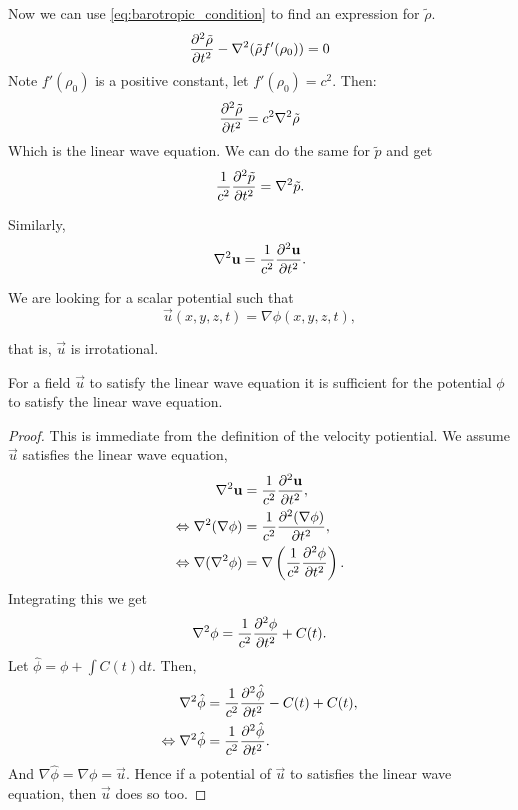 Now we can use \ref{eq:barotropic_condition} to find an expression for $\tilde{\rho}$.
\begin{equation*}
    \frac{\partial ^2 \tilde{\rho}}{\partial t^2} - \nabla^2 (\tilde{\rho} f'(\rho_0)) = 0
\end{equation*}
Note $f'(\rho_0)$ is a positive constant, let $f'(\rho_0) = c^2$. Then:
\begin{equation}
    \frac{\partial ^2 \tilde{\rho}}{\partial t^2} = c^2 \nabla^2 \tilde{\rho}
\end{equation}
Which is the linear wave equation. We can do the same for $\tilde{p}$ and get
    \begin{equation}
        \frac{1}{c^2}\frac{\partial ^2 \tilde{p}}{\partial t^2} = \nabla^2 \tilde{p}.
    \end{equation}\par
%
Similarly,
    \begin{equation}
        \nabla^2 \mathbf{u} = \frac{1}{c^2} \frac{\partial ^2 \mathbf{u}}{\partial t^2}.
    \end{equation} \par
%
We are looking for a scalar potential such that
\begin{equation}
    \vec{u}(x, y, z, t) = \nabla \phi(x, y, z, t),
\end{equation}\par
that is, $\vec{u}$ is irrotational.
%
%
\begin{propn} \label{propn:potential_satisfies_linear_wave_eq}
  For a field $\vec{u}$ to satisfy the linear wave equation it is sufficient for the potential $\phi$ to satisfy the linear wave equation.
\end{propn}
\begin{proof}
  This is immediate from the definition of the velocity potiential. We assume $\vec{u}$ satisfies the linear wave equation,
  \begin{align*}
    \nabla^2 \mathbf{u} &= \frac{1}{c^2} \frac{\partial ^2 \mathbf{u}}{\partial t^2},\\
    \Leftrightarrow \nabla^2 (\nabla \phi) &= \frac{1}{c^2} \frac{\partial ^2 (\nabla \phi)}{\partial t^2},\\
    \Leftrightarrow \nabla (\nabla^2 \phi) &= \nabla \left(\frac{1}{c^2} \frac{\partial ^2 \phi}{\partial t^2}\right).
  \end{align*}
  Integrating this we get
  \begin{align*}
      \nabla^2 \phi = \frac{1}{c^2} \frac{\partial ^2 \phi}{\partial t^2} + C(t).
  \end{align*}
  Let $\hat{\phi}=\phi + \int C(t) \text{d} t$. Then,
  \begin{align*}
    \nabla^2 \hat{\phi} &= \frac{1}{c^2} \frac{\partial ^2 \hat{\phi}}{\partial t^2}-C(t)+C(t),\\
    \Leftrightarrow \nabla^2 \hat{\phi} &= \frac{1}{c^2} \frac{\partial ^2 \hat{\phi}}{\partial t^2}.
  \end{align*}
  And $\nabla\hat{\phi}=\nabla\phi=\vec{u}$. Hence if a potential of $\vec{u}$ to satisfies the linear wave equation, then $\vec{u}$ does so too.
\end{proof}

